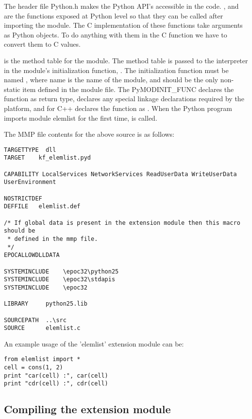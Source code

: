The header file Python.h makes the Python API's accessible in the code.
,  and  are the functions exposed
at Python level so that they can be called after importing the  module.
The C implementation of these functions take arguments as Python objects.
To do anything with them in the C function we have to convert them to C values.

 is the method table for the module. The method table is
passed to the interpreter in the module's initialization function, .
The initialization function must be named , where name is the
name of the module, and should be the only non-static item defined in the module file.
The PyMODINIT_FUNC declares the function as  return type, declares any special
linkage declarations required by the platform, and for C++ declares the function
as . When the Python program imports module  elemlist for the
first time,  is called.

The MMP file contents for the above source is as follows:

\begin{verbatim}
TARGETTYPE  dll
TARGET    kf_elemlist.pyd

CAPABILITY LocalServices NetworkServices ReadUserData WriteUserData UserEnvironment

NOSTRICTDEF
DEFFILE   elemlist.def

/* If global data is present in the extension module then this macro should be
 * defined in the mmp file.
 */
EPOCALLOWDLLDATA

SYSTEMINCLUDE    \epoc32\python25
SYSTEMINCLUDE    \epoc32\stdapis
SYSTEMINCLUDE    \epoc32

LIBRARY     python25.lib

SOURCEPATH  ..\src
SOURCE      elemlist.c
\end{verbatim}


An example usage of the 'elemlist' extension module can be:

\begin{verbatim}
from elemlist import *
cell = cons(1, 2)
print "car(cell) :", car(cell)
print "cdr(cell) :", cdr(cell)
\end{verbatim}

\subsection{Compiling the extension module}

